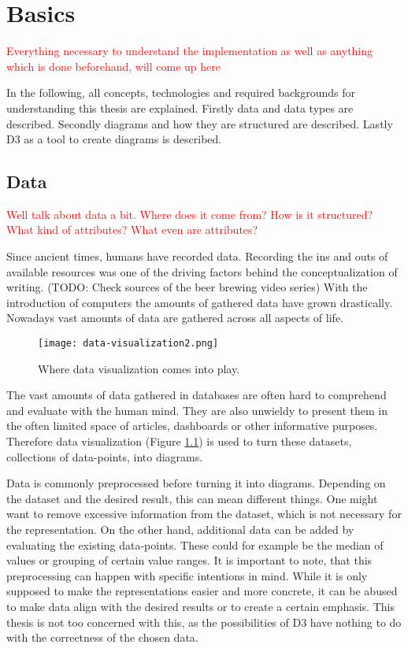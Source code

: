 \chapter{Basics}
\textcolor{red}{
Everything necessary to understand the implementation as well as anything which is done beforehand, will come up here}

In the following, all concepts, technologies and required backgrounds for understanding this thesis are explained. Firstly data and data types are described. Secondly diagrams and how they are structured are described. Lastly D3 as a tool to create diagrams is described.


\section{Data}
\textcolor{red}{
Well talk about data a bit. Where does it come from? How is it structured? What kind of attributes? What even are attributes?}

Since ancient times, humans have recorded data. Recording the ins and outs of available resources was one of the driving factors behind the conceptualization of writing. (TODO: Check sources of the beer brewing video series)
With the introduction of computers the amounts of gathered data have grown drastically. Nowadays vast amounts of data are gathered across all aspects of life.

\begin{figure}
    \label{fig:data-visualization}
    \texttt{[image: data-visualization2.png]}
    \caption[data-visualization]{Where data visualization comes into play.}
\end{figure}

The vast amounts of data gathered in databases are often hard to comprehend and evaluate with the human mind. They are also unwieldy to present them in the often limited space of articles, dashboards or other informative purposes. Therefore data visualization (Figure \ref{fig:data-visualization}) is used to turn these datasets, collections of data-points, into diagrams.

Data is commonly preprocessed before turning it into diagrams. Depending on the dataset and the desired result, this can mean different things. One might want to remove excessive information from the dataset, which is not necessary for the representation. On the other hand, additional data can be added by evaluating the existing data-points. These could for example be the median of values or grouping of certain value ranges. It is important to note, that this preprocessing can happen with specific intentions in mind. While it is only supposed to make the representations easier and more concrete, it can be abused to make data align with the desired results or to create a certain emphasis. This thesis is not too concerned with this, as the possibilities of D3 have nothing to do with the correctness of the chosen data.

